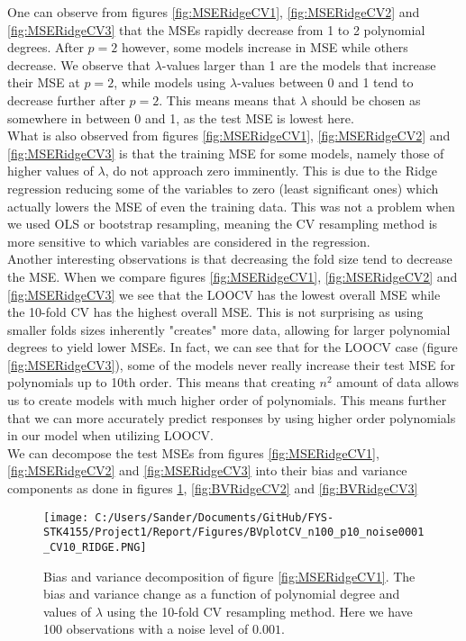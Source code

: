 \documentclass[12pt,a4paper]{article}
\begin{document}
\noindent One can observe from figures \ref{fig:MSERidgeCV1}, \ref{fig:MSERidgeCV2} and \ref{fig:MSERidgeCV3} that the MSEs rapidly decrease from 1 to 2 polynomial degrees. After $p = 2$ however, some models increase in MSE while others decrease. We observe that $\lambda$-values larger than 1 are the models that increase their MSE at $p = 2$, while models using $\lambda$-values between 0 and 1 tend to decrease further after $p = 2$. This means means that $\lambda$ should be chosen as somewhere in between 0 and 1, as the test MSE is lowest here.
\\
What is also observed from figures \ref{fig:MSERidgeCV1}, \ref{fig:MSERidgeCV2} and \ref{fig:MSERidgeCV3} is that the training MSE for some models, namely those of higher values of $\lambda$, do not approach zero imminently. This is due to the Ridge regression reducing some of the variables to zero (least significant ones) which actually lowers the MSE of even the training data. This was not a problem when we used OLS or bootstrap resampling, meaning the CV resampling method is more sensitive to which variables are considered in the regression. 
\\
Another interesting observations is that decreasing the fold size tend to decrease the MSE. When we compare figures \ref{fig:MSERidgeCV1}, \ref{fig:MSERidgeCV2} and \ref{fig:MSERidgeCV3} we see that the LOOCV has the lowest overall MSE while the 10-fold CV has the highest overall MSE. This is not surprising as using smaller folds sizes inherently "creates" more data, allowing for larger polynomial degrees to yield lower MSEs. In fact, we can see that for the LOOCV case (figure \ref{fig:MSERidgeCV3}), some of the models never really increase their test MSE for polynomials up to 10th order. This means that creating $n^2$ amount of data allows us to create models with much higher order of polynomials. This means further that we can more accurately predict responses by using higher order polynomials in our model when utilizing LOOCV.
\\
We can decompose the test MSEs from figures \ref{fig:MSERidgeCV1}, \ref{fig:MSERidgeCV2} and \ref{fig:MSERidgeCV3} into their bias and variance components as done in figures \ref{fig:BVRidgeCV1}, \ref{fig:BVRidgeCV2} and \ref{fig:BVRidgeCV3}

\begin{figure}[H]
\centering
\texttt{[image: C:/Users/Sander/Documents/GitHub/FYS-STK4155/Project1/Report/Figures/BVplotCV\_n100\_p10\_noise0001\_CV10\_RIDGE.PNG]}
\caption{\label{fig:BVRidgeCV1} Bias and variance decomposition of figure \ref{fig:MSERidgeCV1}. The bias and variance change as a function of polynomial degree and values of $\lambda$ using the 10-fold CV resampling method. Here we have 100 observations with a noise level of $0.001$.}
\end{figure}
\end{document}
